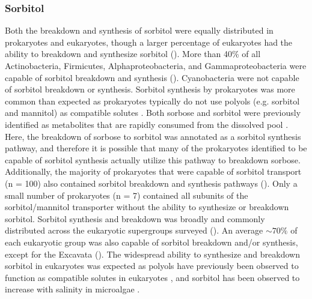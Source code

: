 \documentclass[utf8]{frontiersSCNS} %
\begin{document}
\subsubsection*{Sorbitol}
Both the breakdown and synthesis of sorbitol were equally distributed in prokaryotes and eukaryotes, though a larger percentage of eukaryotes had the ability to breakdown and synthesize sorbitol (). More than 40\% of all Actinobacteria, Firmicutes, Alphaproteobacteria, and Gammaproteobacteria were capable of sorbitol breakdown and synthesis (). Cyanobacteria were not capable of sorbitol breakdown or synthesis. Sorbitol synthesis by prokaryotes was more common than expected as prokaryotes typically do not use polyols (e.g. sorbitol and mannitol) as compatible solutes \citep{Kinne1993,Empadinhas2008}. Both sorbose and sorbitol were previously identified as metabolites that are rapidly consumed from the dissolved pool \citep{Vorobev2018}. Here, the breakdown of sorbose to sorbitol was annotated as a sorbitol synthesis pathway, and therefore it is possible that many of the prokaryotes identified to be capable of sorbitol synthesis actually utilize this pathway to breakdown sorbose. Additionally, the majority of prokaryotes that were capable of sorbitol transport (n = 100) also contained sorbitol breakdown and synthesis pathways (). Only a small number of prokaryotes (n = 7) contained all subunits of the sorbitol/mannitol transporter without the ability to synthesize or breakdown sorbitol.  Sorbitol synthesis and breakdown was broadly and commonly distributed across the eukaryotic supergroups surveyed (). An average $\sim 70\%$ of each eukaryotic group was also capable of sorbitol breakdown and/or synthesis, except for the Excavata (). The widespread ability to synthesize and breakdown sorbitol in eukaryotes was expected as polyols have previously been observed to function as compatible solutes in eukaryotes \citep{Burg2008}, and sorbitol has been observed to increase with salinity in microalgae \citep{Brown1978}. 
\end{document}
